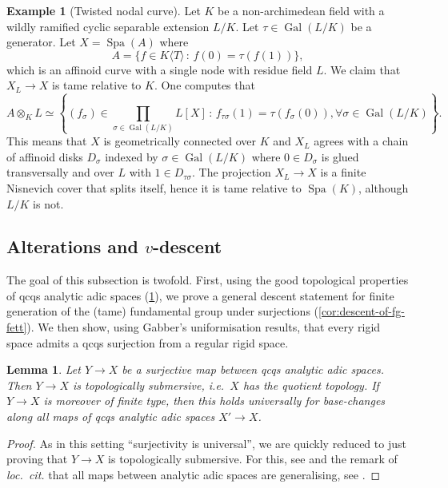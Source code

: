 \documentclass[a4paper,twoside,11pt,reqno]{amsart}
\DeclareMathOperator{\Gal}{Gal}
\DeclareMathOperator{\Spa}{Spa}
\newtheorem{lem}[thm]{Lemma}
\theoremstyle{definition}
\newtheorem{ex}[thm]{Example}
\numberwithin{equation}{subsection}
\begin{document}
\begin{ex}[Twisted nodal curve] \label{ex:moregeneral-twisted-nodal-curve}
Let $K$ be a non-archimedean field with a wildly ramified cyclic separable extension $L/K$. Let $\tau \in \Gal(L/K)$ be a generator. Let $X=\Spa(A)$ where
\[
    A= \{f\in K\langle T\rangle\,:\, f(0) = \tau(f(1))\}, 
\]
which is an affinoid curve with a single node with residue field $L$. We claim that $X_L\to X$ is tame relative to $K$. 
One computes that 
\[
    A\otimes_K L \simeq \left\{(f_\sigma) \in {\textstyle \prod_{\sigma \in \Gal(L/K)}} L[X] \,:\, f_{\tau\sigma}(1)=\tau(f_{\sigma}(0)), \forall \sigma \in \Gal(L/K) \right\}.
    \]
This means that $X$ is geometrically connected over $K$ and $X_L$ agrees with a chain of affinoid disks $D_\sigma$ indexed by $\sigma \in \Gal(L/K)$ where $0 \in D_{\sigma}$ is glued transversally and over $L$ with $1 \in D_{\tau\sigma}$. The projection $X_L \to X$ is a finite Nisnevich cover that splits itself, hence it is tame relative to $\Spa(K)$, although $L/K$ is not. 
\end{ex}
    

\subsection{\texorpdfstring{Alterations and $v$-descent}{Alterations and v-descent}}
\label{ss:alterations-v-descent}

The goal of this subsection is twofold. First, using the good topological properties of qcqs analytic adic spaces (\cref{lem:submersive}), we prove a general descent statement for finite generation of the (tame) fundamental group under surjections (\cref{cor:descent-of-fg-fett}). We then show, using Gabber's uniformisation results, that every rigid space admits a qcqs surjection from a regular rigid space. 

\begin{lem} 
\label{lem:submersive}
    Let $Y\to X$ be a surjective map between qcqs analytic adic spaces. Then $Y\to X$ is topologically submersive, i.e.\ $X$ has the quotient topology. If $Y\to X$ is moreover of finite type, then this holds universally for base-changes along all maps of qcqs analytic adic spaces $X'\to X$. 
\end{lem}

\begin{proof}
As in this setting ``surjectivity is universal'', we are quickly reduced to just proving that $Y\to X$ is topologically submersive. For this, see \cite[Lemma~2.5]{ScholzeECoD} and the remark of \emph{loc.~cit.} that all maps between analytic adic spaces are generalising, see \cite[Lemma~1.1.10(v)]{HuberBook}. 
\end{proof}
\end{document}
